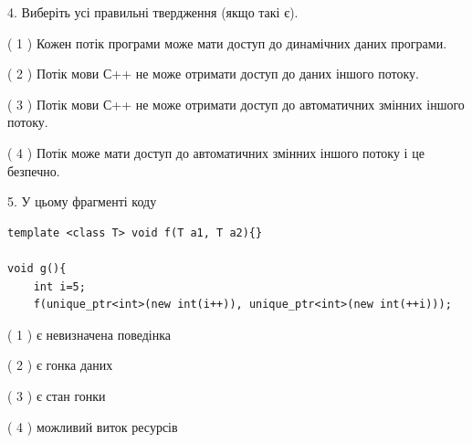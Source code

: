 \documentclass[12pt, ukrainian]{article}
\begin{document}
\begin {large}
{%
4. Виберіть усі правильні твердження (якщо такі є).\par
\vspace{2mm}

( 1 ) Кожен потік програми може мати доступ до динамічних даних програми.%

( 2 ) Потік мови С++ не може отримати доступ до даних іншого потоку.%

( 3 ) Потік мови С++ не може отримати доступ до автоматичних змінних іншого потоку.%

( 4 ) Потік може мати доступ до автоматичних змінних іншого потоку і це безпечно.%


5. У цьому фрагменті коду
\begin{verbatim}
template <class T> void f(T a1, T a2){}

void g(){
    int i=5;
    f(unique_ptr<int>(new int(i++)), unique_ptr<int>(new int(++i)));
\end{verbatim}

( 1 ) є невизначена поведінка%

( 2 ) є гонка даних%

( 3 ) є стан гонки%

( 4 ) можливий виток ресурсів%
}
\end {large}
\end{document}
